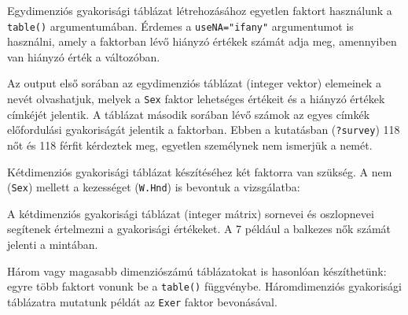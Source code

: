 \documentclass[
]{book}
\newenvironment{Shaded}{\begin{snugshade}}{\end{snugshade}}
\newcommand{\AttributeTok}[1]{\textcolor[rgb]{0.77,0.63,0.00}{#1}}
\newcommand{\CommentTok}[1]{\textcolor[rgb]{0.56,0.35,0.01}{\textit{#1}}}
\newcommand{\FunctionTok}[1]{\textcolor[rgb]{0.00,0.00,0.00}{#1}}
\newcommand{\NormalTok}[1]{#1}
\newcommand{\SpecialCharTok}[1]{\textcolor[rgb]{0.00,0.00,0.00}{#1}}
\newcommand{\StringTok}[1]{\textcolor[rgb]{0.31,0.60,0.02}{#1}}
\begin{document}
Egydimenziós gyakorisági táblázat létrehozásához egyetlen faktort használunk a \texttt{table()} argumentumában. Érdemes a \texttt{useNA="ifany"} argumentumot is használni, amely a faktorban lévő hiányzó értékek számát adja meg, amennyiben van hiányzó érték a változóban.

\begin{Shaded}
\end{Shaded}

Az output első sorában az egydimenziós táblázat (integer vektor) elemeinek a nevét olvashatjuk, melyek a \texttt{Sex} faktor lehetséges értékeit és a hiányzó értékek címkéjét jelentik. A táblázat második sorában lévő számok az egyes címkék előfordulási gyakoriságát jelentik a faktorban. Ebben a kutatásban (\texttt{?survey}) 118 nőt és 118 férfit kérdeztek meg, egyetlen személynek nem ismerjük a nemét.

Kétdimenziós gyakorisági táblázat készítéséhez két faktorra van szükség. A nem (\texttt{Sex}) mellett a kezességet (\texttt{W.Hnd}) is bevontuk a vizsgálatba:

\begin{Shaded}
\end{Shaded}

A kétdimenziós gyakorisági táblázat (integer mátrix) sornevei és oszlopnevei segítenek értelmezni a gyakorisági értékeket. A 7 például a balkezes nők számát jelenti a mintában.

Három vagy magasabb dimenziószámú táblázatokat is hasonlóan készíthetünk: egyre több faktort vonunk be a \texttt{table()} függvénybe. Háromdimenziós gyakorisági táblázatra mutatunk példát az \texttt{Exer} faktor bevonásával.
\end{document}

